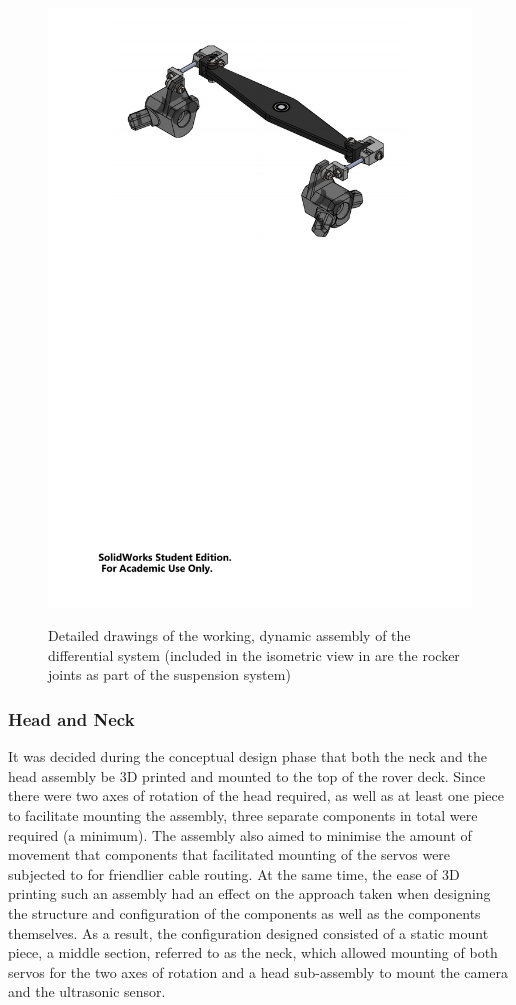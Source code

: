 \begin{figure}[H]
{          \includegraphics[clip, trim=4cm 17cm 4cm 1cm, width=0.7\linewidth]{figures/diff-sub-iso}
        }
        \caption[Detailed drawings of the working, dynamic assembly of the differential system]{Detailed drawings of the working, dynamic assembly of the differential system (included in the isometric view in \protect{} are the rocker joints as part of the suspension system)}
        \label{fig:mechDesign-differentialSubDetail}
        \end{figure}
        
              
    \subsubsection{Head and Neck}
      It was decided during the conceptual design phase that both the neck and the head assembly be 3D printed and mounted to the top of the rover deck. Since there were two axes of rotation of the head required, as well as at least one piece to facilitate mounting the assembly, three separate components in total were required (a minimum). The assembly also aimed to minimise the amount of movement that components that facilitated mounting of the servos were subjected to for friendlier cable routing. At the same time, the ease of 3D printing such an assembly had an effect on the approach taken when designing the structure and configuration of the components as well as the components themselves. As a result, the configuration designed consisted of a static mount piece, a middle section, referred to as the neck, which allowed mounting of both servos for the two axes of rotation and a head sub-assembly to mount the camera and the ultrasonic sensor.
      
